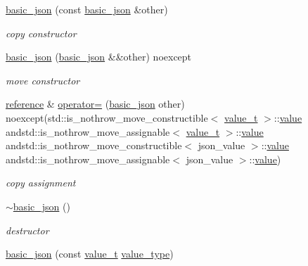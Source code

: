 \begin{DoxyCompactItemize}
\hyperlink{classnlohmann_1_1basic__json_a4ab93491f82545342562c7ee7e3166c7}{basic\-\_\-json} (const \hyperlink{classnlohmann_1_1basic__json}{basic\-\_\-json} \&other)
\begin{DoxyCompactList}\small\item\em copy constructor \end{DoxyCompactList}\item 
\hyperlink{classnlohmann_1_1basic__json_a73e150cbcba5643cb89de8f515eb64e2}{basic\-\_\-json} (\hyperlink{classnlohmann_1_1basic__json}{basic\-\_\-json} \&\&other) noexcept
\begin{DoxyCompactList}\small\item\em move constructor \end{DoxyCompactList}\item 
\hyperlink{classnlohmann_1_1basic__json_a3ec8e17be8732fe436e9d6733f52b7a3}{reference} \& \hyperlink{classnlohmann_1_1basic__json_aa2dd4722bc4e87b0738c90a1352bf213}{operator=} (\hyperlink{classnlohmann_1_1basic__json}{basic\-\_\-json} other) noexcept(std\-::is\-\_\-nothrow\-\_\-move\-\_\-constructible$<$ \hyperlink{classnlohmann_1_1basic__json_a231b02148577b69a154b2ce2c87a5522}{value\-\_\-t} $>$\-::\hyperlink{classnlohmann_1_1basic__json_a0a2cbbd95862a623e7dc5c37e67dead0}{value} andstd\-::is\-\_\-nothrow\-\_\-move\-\_\-assignable$<$ \hyperlink{classnlohmann_1_1basic__json_a231b02148577b69a154b2ce2c87a5522}{value\-\_\-t} $>$\-::\hyperlink{classnlohmann_1_1basic__json_a0a2cbbd95862a623e7dc5c37e67dead0}{value} andstd\-::is\-\_\-nothrow\-\_\-move\-\_\-constructible$<$ json\-\_\-value $>$\-::\hyperlink{classnlohmann_1_1basic__json_a0a2cbbd95862a623e7dc5c37e67dead0}{value} andstd\-::is\-\_\-nothrow\-\_\-move\-\_\-assignable$<$ json\-\_\-value $>$\-::\hyperlink{classnlohmann_1_1basic__json_a0a2cbbd95862a623e7dc5c37e67dead0}{value})
\begin{DoxyCompactList}\small\item\em copy assignment \end{DoxyCompactList}\item 
\hyperlink{classnlohmann_1_1basic__json_a947b5b2a832e490858dbdddfe7085831}{$\sim$basic\-\_\-json} ()
\begin{DoxyCompactList}\small\item\em destructor \end{DoxyCompactList}\item 
\hyperlink{classnlohmann_1_1basic__json_a8f77085bd98c97a983d9ba12efbf6148}{basic\-\_\-json} (const \hyperlink{classnlohmann_1_1basic__json_a231b02148577b69a154b2ce2c87a5522}{value\-\_\-t} \hyperlink{classnlohmann_1_1basic__json_ac8d45b57874b4a6e9c07f7d3b5daa1f9}{value\-\_\-type})

\end{DoxyCompactItemize}

